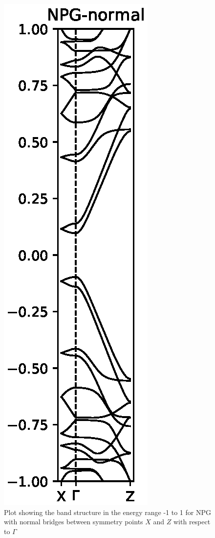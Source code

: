 \begin{figure}[H]
    \centering
    \includegraphics{Figures/FabNPGBS.eps}
    \caption{Plot showing the band structure in the energy range -1 to 1 for NPG with normal bridges between symmetry points \(X\) and \(Z\) with respect to \(\Gamma\)}
    \label{Fab}
\end{figure}

